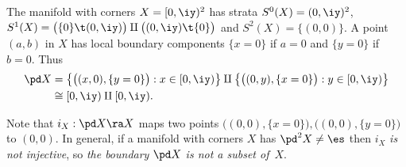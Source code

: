 \documentclass{article}
\begin{document}
\begin{ex} The manifold with corners $X=[0,\iy)^2$ has strata
$S^0(X)=(0,\iy)^2$, $S^1(X)=\bigl(\{0\}\t(0,\iy)\bigr)\amalg
\bigl((0,\iy)\t\{0\}\bigr)$ and $S^2(X)=\{(0,0)\}$. A point $(a,b)$
in $X$ has local boundary components $\{x=0\}$ if $a=0$ and
$\{y=0\}$ if $b=0$. Thus
\begin{align*}
\pd X&=\bigl\{\bigl((x,0),\{y=0\}\bigr):x\in[0,\iy)\bigr\}\amalg
\bigl\{\bigl((0,y),\{x=0\}\bigr):y\in[0,\iy)\bigr\}\\
&\cong [0,\iy)\amalg[0,\iy).
\end{align*}

Note that $i_X:\pd X\ra X$  maps two points
$\bigl((0,0),\{x=0\}\bigr),\bigl((0,0),\{y=0\}\bigr)$ to $(0,0)$. In
general, if a manifold with corners $X$ has $\pd^2X\ne\es$ then
$i_X$ {\it is not injective}, so {\it the boundary $\pd X$ is not a
subset of\/}~$X$.
\label{ds5ex1}
\end{ex}
\end{document}
